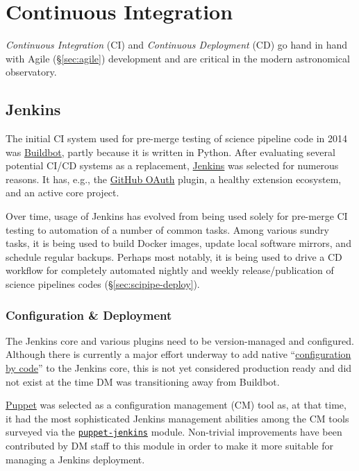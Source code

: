 \section{Continuous Integration}

\emph{Continuous Integration} (CI) and \emph{Continuous Deployment} (CD) go hand in hand with Agile (\S\ref{sec:agile}) development  and  are  critical in the  modern astronomical observatory.\cite{2014arXiv1407.6463E}

\subsection{Jenkins}
\label{sec:jenkins}

 The initial CI system used for pre-merge testing of science pipeline code in 2014  was \href{https://buildbot.net/}{Buildbot}, partly because it is written in Python.
After evaluating several potential CI/CD systems as a replacement,
\href{https://jenkins.io/}{Jenkins} was selected for numerous reasons.
It has, e.g.,  the \href{https://plugins.jenkins.io/github-oauth}{GitHub OAuth} plugin,
a healthy extension ecosystem, and an active core project.

Over time, usage of Jenkins has evolved from being used solely for pre-merge
CI testing to automation of a number of common tasks.  Among various sundry
tasks, it is being used to build Docker images, update local software mirrors, and
schedule regular backups.  Perhaps most notably, it is being used to drive a
CD workflow for completely automated nightly and weekly
release/publication of science pipelines codes (\S\ref{sec:scipipe-deploy}).

\subsubsection{Configuration \& Deployment}

The Jenkins core and various plugins need to be version-managed and configured.
Although there is currently a major effort underway to add native
``\href{https://github.com/jenkinsci/configuration-as-code-plugin}{configuration by code}'' to
the Jenkins core, this is not yet considered production ready and did not exist
at the time DM was transitioning away from Buildbot.

\href{https://puppet.com/}{Puppet} was selected as a configuration management (CM) tool as, at that time, it had the most sophisticated Jenkins
management abilities among the CM tools surveyed via the \href{https://github.com/voxpupuli/puppet-jenkins}{\texttt{puppet-jenkins}} module.
Non-trivial improvements have been contributed by DM staff to this module\cite{puppetconf-jenkins} in order to make it more suitable for managing a Jenkins deployment.

